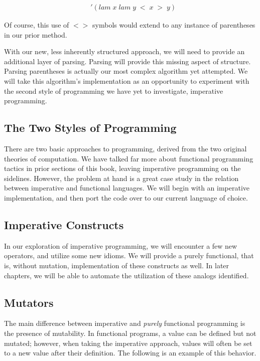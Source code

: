 \begin{figure}[ht]
\caption{}\label{scheme}
\begin{align*}
& '(lam \; x \; lam \; y \; < \; x \; > \; y)
\end{align*}
\end{figure}

Of course, this use of $<>$ symbols would extend to any instance of parentheses 
in our prior method.

With our new, less inherently structured approach, we will need to provide an 
additional layer of parsing. Parsing will provide this missing aspect of structure. 
Parsing parentheses is actually our most complex algorithm yet attempted. We will 
take this algorithm's implementation as an opportunity to experiment with the 
second style of programming we have yet to investigate, imperative programming.

\subsection{The Two Styles of Programming}
There are two basic approaches to programming, derived from the two original 
theories of computation. We have talked far more about functional programming 
tactics in prior sections of this book, leaving imperative programming on the 
sidelines. However, the problem at hand is a great case study in the relation 
between imperative and functional languages. We will begin with an imperative 
implementation, and then port the code over to our current language of choice.

\subsection{Imperative Constructs}
In our exploration of imperative programming, we will encounter a few new operators, 
and utilize some new idioms. We will provide a purely functional, that is, without
mutation, implementation of these constructs as well. In later chapters, we will be
able to automate the utilization of these analogs identified.

\subsection{Mutators}
The main difference between imperative and \emph{purely} functional programming is the 
presence of mutability. In functional programs, a value can be defined but not 
mutated; however, when taking the imperative approach, values will often be set to 
a new value after their definition. The following is an example of this behavior.


